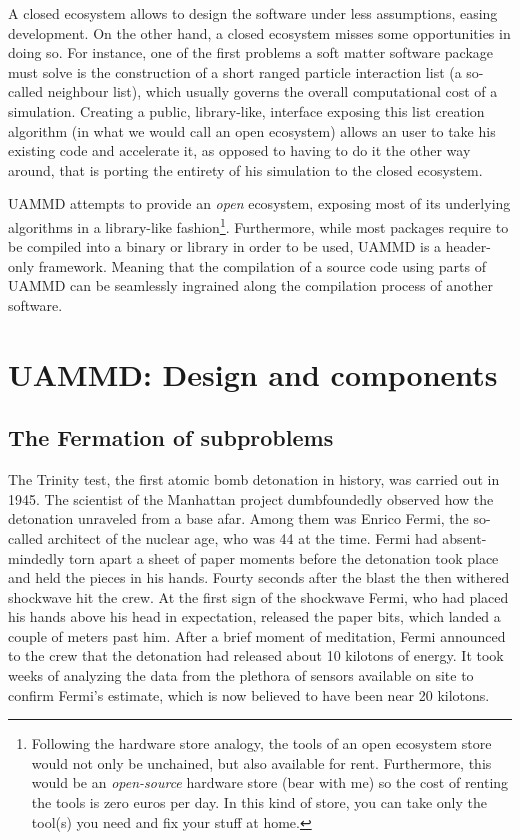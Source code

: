 \documentclass[ twoside,openright,titlepage,numbers=noenddot,%
headinclude,footinclude,cleardoublepage=empty,abstract=on,
BCOR=5mm,paper=a4,fontsize=11pt, dvipsnames
]{scrreprt}
\newcommand{\uammd}{\gls{UAMMD}\xspace}
\newcommand{\gpu}{\gls{GPU}\xspace}
\begin{document}
A closed ecosystem allows to design the software under less assumptions, easing development. On the other hand, a closed ecosystem misses some opportunities in doing so. For instance, one of the first problems a soft matter software package must solve is the construction of a short ranged particle interaction list (a so-called neighbour list), which usually governs the overall computational cost of a simulation. Creating a public, library-like, interface exposing this list creation algorithm (in what we would call an open ecosystem) allows an user to take his existing code and accelerate it, as opposed to having to do it the other way around, that is porting the entirety of his simulation to the closed ecosystem.

\uammd attempts to provide an \emph{open} ecosystem, exposing most of its underlying algorithms in a library-like fashion\footnote{Following the hardware store analogy, the tools of an open ecosystem store would not only be unchained, but also available for rent. Furthermore, this would be an \emph{open-source} hardware store (bear with me) so the cost of renting the tools is zero euros per day. In this kind of store, you can take only the tool(s) you need and fix your stuff at home.}.
Furthermore, while most packages require to be compiled into a binary or library in order to be used, \uammd is a header-only framework. Meaning that the compilation of a source code using parts of \uammd can be seamlessly ingrained along the compilation process of another software.


\newpage
\cleardoublepage
{}
\part{UAMMD: Design and components}\label{pt:uammd}

\chapter{The Fermation of subproblems}
The Trinity test, the first atomic bomb detonation in history, was carried out in 1945. The scientist of the Manhattan project dumbfoundedly observed how the detonation unraveled from a base afar. Among them was Enrico Fermi, the so-called architect of the nuclear age, who was 44 at the time. Fermi had absent-mindedly torn apart a sheet of paper moments before the detonation took place and held the pieces in his hands. Fourty seconds after the blast the then withered shockwave hit the crew. At the first sign of the shockwave Fermi, who had placed his hands above his head in expectation, released the paper bits, which landed a couple of meters past him. After a brief moment of meditation, Fermi announced to the crew that the detonation had released about 10 kilotons of energy.
It took weeks of analyzing the data from the plethora of sensors available on site to confirm Fermi's estimate, which is now believed to have been near 20 kilotons.
\end{document}
